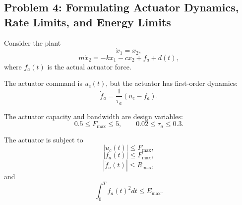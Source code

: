\subsection*{Problem 4: Formulating Actuator Dynamics, Rate Limits, and Energy Limits}

Consider the plant
\begin{equation}
\dot{x}_1=x_2,
\end{equation}
\begin{equation}
m\dot{x}_2=-kx_1-cx_2+f_a+d(t),
\end{equation}
where $f_a(t)$ is the actual actuator force.

The actuator command is $u_c(t)$, but the actuator has first-order dynamics:
\begin{equation}
\dot{f}_a
=
\frac{1}{\tau_a}
\left(
u_c-f_a
\right).
\end{equation}

The actuator capacity and bandwidth are design variables:
\begin{equation}
0.5\leq F_{\max}\leq5,
\qquad
0.02\leq\tau_a\leq0.3.
\end{equation}

The actuator is subject to
\begin{equation}
|u_c(t)|\leq F_{\max},
\end{equation}
\begin{equation}
|f_a(t)|\leq F_{\max},
\end{equation}
\begin{equation}
|\dot{f}_a(t)|\leq R_{\max},
\end{equation}
and
\begin{equation}
\int_0^T
f_a(t)^2dt
\leq E_{\max}.
\end{equation}

